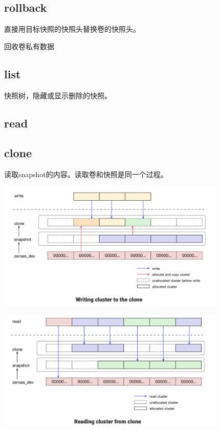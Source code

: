 \subsection{rollback}

直接用目标快照的快照头替换卷的快照头。

回收卷私有数据

\subsection{list}

快照树，隐藏或显示删除的快照。

\subsection{read}

\subsection{clone}

读取snapshot的内容。读取卷和快照是同一个过程。

\begin{center}
\includegraphics[width=11cm]{../imgs/clone-write.png}
\end{center}

\begin{center}
\includegraphics[width=11cm]{../imgs/clone-read.png}
\end{center}

